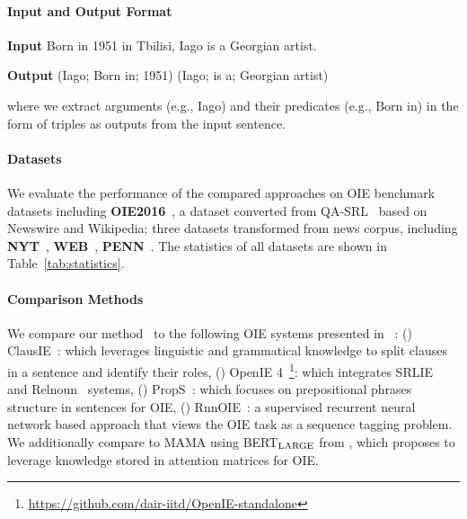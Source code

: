\paragraph{Input and Output Format}
\begin{enumerate*}
    \item[] {\bf Input} Born in 1951 in Tbilisi, Iago is a Georgian artist.
    \item[] {\bf Output} (Iago; Born in; 1951) (Iago; is a; Georgian artist)
\end{enumerate*}

\noindent where we extract arguments (e.g., Iago) and their predicates (e.g., Born in) in the form of triples as outputs from the input sentence.

\paragraph{Datasets} We evaluate the performance of the compared approaches on OIE benchmark datasets including {\bf OIE2016}~\cite{stanovsky2016creating}, a dataset converted from QA-SRL~\cite{he2015question} based on Newswire and Wikipedia; three datasets transformed from news corpus, including {\bf NYT}~\cite{mesquita2013effectiveness}, {\bf WEB}~\cite{mesquita2013effectiveness}, {\bf PENN}~\cite{xu2013open}. The statistics of all datasets are shown in Table~\ref{tab:statistics}. 

\paragraph{Comparison Methods} We compare our method \method\ to the following OIE systems presented in ~\cite{stanovsky2018supervised}: (\expandafter{}) ClausIE~\cite{del2013clausie}: which leverages linguistic and grammatical knowledge to split clauses in a sentence and identify their roles, (\expandafter{}) OpenIE 4~\footnote{\label{ft:openie51}\tiny\url{https://github.com/dair-iitd/OpenIE-standalone}}: which integrates SRLIE~\cite{christensen2011analysis} and Relnoun~\cite{pal2016demonyms} systems, (\expandafter{}) PropS~\cite{stanovsky2016getting}: which focuses on prepositional phrases structure in sentences for OIE, (\expandafter{}) RnnOIE~\cite{stanovsky2018supervised}: a supervised recurrent neural network based approach that views the OIE task as a sequence tagging problem. We additionally compare to MAMA using BERT$_{\rm{LARGE}}$ from \cite{wang2020language}, which proposes to leverage knowledge stored in attention matrices for OIE.

